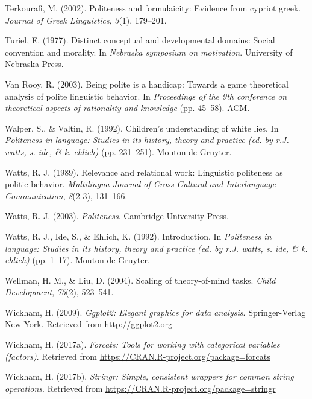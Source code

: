 \documentclass[oneside]{report}
\begin{document}
\hypertarget{ref-terkourafi2002}{}
Terkourafi, M. (2002). Politeness and formulaicity: Evidence from
cypriot greek. \emph{Journal of Greek Linguistics}, \emph{3}(1),
179--201.

\hypertarget{ref-turiel1977}{}
Turiel, E. (1977). Distinct conceptual and developmental domains: Social
convention and morality. In \emph{Nebraska symposium on motivation}.
University of Nebraska Press.

\hypertarget{ref-vanRooy2003}{}
Van Rooy, R. (2003). Being polite is a handicap: Towards a game
theoretical analysis of polite linguistic behavior. In \emph{Proceedings
of the 9th conference on theoretical aspects of rationality and
knowledge} (pp. 45--58). ACM.

\hypertarget{ref-walper1992}{}
Walper, S., \& Valtin, R. (1992). Children's understanding of white
lies. In \emph{Politeness in language: Studies in its history, theory
and practice (ed. by r.J. watts, s. ide, \& k. ehlich)} (pp. 231--251).
Mouton de Gruyter.

\hypertarget{ref-watts1989}{}
Watts, R. J. (1989). Relevance and relational work: Linguistic
politeness as politic behavior. \emph{Multilingua-Journal of
Cross-Cultural and Interlanguage Communication}, \emph{8}(2-3),
131--166.

\hypertarget{ref-watts2003}{}
Watts, R. J. (2003). \emph{Politeness}. Cambridge University Press.

\hypertarget{ref-watts1992}{}
Watts, R. J., Ide, S., \& Ehlich, K. (1992). Introduction. In
\emph{Politeness in language: Studies in its history, theory and
practice (ed. by r.J. watts, s. ide, \& k. ehlich)} (pp. 1--17). Mouton
de Gruyter.

\hypertarget{ref-wellman2004}{}
Wellman, H. M., \& Liu, D. (2004). Scaling of theory-of-mind tasks.
\emph{Child Development}, \emph{75}(2), 523--541.

\hypertarget{ref-R-ggplot2}{}
Wickham, H. (2009). \emph{Ggplot2: Elegant graphics for data analysis}.
Springer-Verlag New York. Retrieved from \url{http://ggplot2.org}

\hypertarget{ref-R-forcats}{}
Wickham, H. (2017a). \emph{Forcats: Tools for working with categorical
variables (factors)}. Retrieved from
\url{https://CRAN.R-project.org/package=forcats}

\hypertarget{ref-R-stringr}{}
Wickham, H. (2017b). \emph{Stringr: Simple, consistent wrappers for
common string operations}. Retrieved from
\url{https://CRAN.R-project.org/package=stringr}
\end{document}
